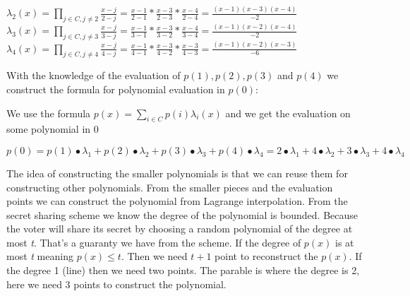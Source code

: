 \begin{center}
\begin{math} \lambda_2(x)=\prod\limits_{j\in C,j\neq2} \frac{x-j}{2-j} = \frac{x-1}{2-1}*\frac{x-3}{2-3}*\frac{x-4}{2-4}=\frac{(x-1)(x-3)(x-4)}{-2} \end{math}\\ \begin{math} \lambda_3(x)=\prod\limits_{j\in C,j\neq3} \frac{x-j}{3-j} = \frac{x-1}{3-1}*\frac{x-3}{3-2}*\frac{x-4}{3-4}=\frac{(x-1)(x-2)(x-4)}{-2} \end{math}\\ \begin{math} \lambda_4(x)=\prod\limits_{j\in C,j\neq4} \frac{x-j}{4-j} = \frac{x-1}{4-1}*\frac{x-3}{4-2}*\frac{x-3}{4-3}=\frac{(x-1)(x-2)(x-3)}{-6} \end{math}\\ \end{center}

\noindent
With the knowledge of the evaluation of \begin{math}p(1), p(2), p(3)\end{math} and  \begin{math}p(4)\end{math} we construct the formula for polynomial evaluation in \begin{math}p(0)\end{math}:


\noindent
\begin{infobox}
We use the formula \begin{math}p(x)=\sum\limits_{i \in C} p(i)\lambda_i(x)\end{math} and we get the evaluation on some polynomial in $0$\\
\begin{center}
\begin{math}p(0)=p(1)∙\lambda_1+p(2)∙\lambda_2+p(3)∙\lambda_3+p(4)∙\lambda_4=2∙\lambda_1+4∙\lambda_2+3∙\lambda_3+4∙\lambda_4 \end{math}
\end{center}
\label{info:Applying_Lagrange_polynomial_interpolation}
\end{infobox}



\noindent
The idea of constructing the smaller polynomials is that we can reuse them for constructing other polynomials. From the smaller pieces and the evaluation points we can construct the polynomial from Lagrange interpolation. From the secret sharing scheme we know the degree of the polynomial is bounded. Because the voter will share its secret by choosing a random polynomial of the degree at most \textit{t}. That’s a guaranty we have from the scheme. If the degree of $p(x)$ is at most \textit{t} meaning $p(x)\leq t$. Then we need $t+1$ point to reconstruct the $p(x)$. If the degree 1 (line) then we need two points. The parable is where the degree is 2, here we need 3 points to construct
the polynomial.

